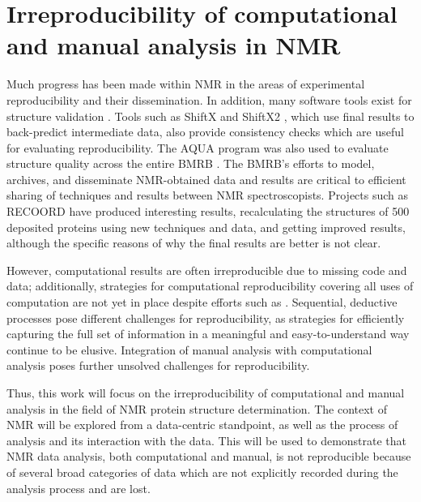 \section{Irreproducibility of computational and manual analysis in NMR}
Much progress has been made within NMR in the areas of experimental
reproducibility and their dissemination.  In addition, many software tools
exist for structure validation 
\cite{doreleijers2012nrg, laskowski1996aqua, bhattacharya2007evaluating}.
Tools such as ShiftX and ShiftX2 \cite{shiftx, shiftx2}, which use final 
results to back-predict intermediate data, also provide consistency checks 
which are useful for evaluating reproducibility.  The AQUA 
\cite{laskowski1996aqua} program was also used to evaluate structure quality 
across the entire BMRB \cite{doreleijers1998quality}.  The BMRB's efforts to 
model, archives, and disseminate NMR-obtained data and results are critical 
to efficient sharing of techniques and results between NMR spectroscopists.
Projects such as RECOORD \cite{nederveen2005recoord} have produced interesting
results, recalculating the structures of 500 deposited proteins using new 
techniques and data, and getting improved results, although the specific
reasons of why the final results are better is not clear.

However, computational results are often irreproducible due to missing code and 
data; additionally, strategies for computational reproducibility covering all 
uses of computation are not yet in place despite efforts such as 
\cite{donoho2009, peng2011reproducible}.
Sequential, deductive processes pose different challenges for reproducibility,
as strategies for efficiently capturing the full set of information in a 
meaningful and easy-to-understand way continue to be elusive.  Integration
of manual analysis with computational analysis poses further unsolved
challenges for reproducibility.

Thus, this work will focus on the irreproducibility of computational and manual
analysis in the field of NMR protein structure determination.
The context of NMR will be explored from a data-centric standpoint, as well as
the process of analysis and its interaction with the data.
This will be used to demonstrate that NMR data analysis, both computational
and manual, is not reproducible
because of several broad categories of data which are not explicitly 
recorded during the analysis process and are lost.


